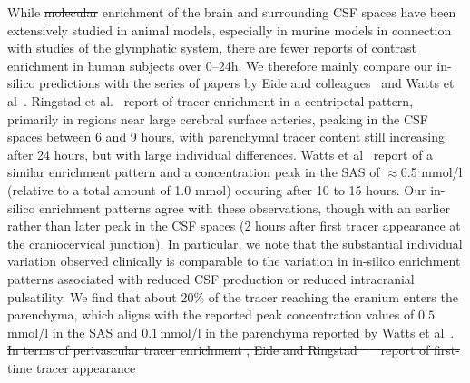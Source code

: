 \documentclass[fleqn,10pt]{wlscirep}
\providecommand{\DIFadd}[1]{{\protect\color{blue}\uwave{#1}}} %
\providecommand{\DIFdel}[1]{{\protect\color{red}\sout{#1}}}                      %
\providecommand{\DIFaddbegin}{} %
\providecommand{\DIFaddend}{} %
\providecommand{\DIFdelbegin}{} %
\providecommand{\DIFdelend}{} %
\begin{document}
While \DIFdelbegin \DIFdel{molecular }\DIFdelend \DIFaddbegin \DIFadd{tracer }\DIFaddend enrichment of the brain and surrounding CSF spaces
have been extensively studied in animal models, especially in murine
models in connection with studies of the glymphatic system, there are
fewer reports of contrast enrichment in human subjects over 0--24h. We
therefore mainly compare our in-silico predictions with the series of
papers by Eide and colleagues~\cite{ringstad2017glymphatic,
  ringstad2018brain, eide2021sleep, eide2024functional} and Watts et
al~\cite{watts2019measuring}. Ringstad et al.~\cite{ringstad2018brain}
report of tracer enrichment in a centripetal pattern, primarily in
regions near large cerebral surface arteries, peaking in the CSF
spaces between 6 and 9 hours, with parenchymal tracer content still
increasing after 24 hours, but with large individual
differences. Watts et al~\cite{watts2019measuring} report of a similar
enrichment pattern and a concentration peak in the SAS of $\approx$0.5
mmol/l (relative to a total amount of 1.0 mmol) occuring after 10 to 15 hours. 
Our in-silico enrichment patterns agree with these observations, though with an earlier rather than later peak in the CSF spaces (2 hours after first tracer appearance at the craniocervical junction). In particular, we note that the substantial individual variation observed clinically is comparable to the variation in in-silico enrichment patterns associated with reduced CSF production or reduced intracranial pulsatility. We find that about 20\% of the tracer reaching the cranium enters the parenchyma, which aligns with the reported peak concentration values of $0.5\,$mmol/l in the SAS and $0.1\,$mmol/l in the parenchyma reported by Watts et al~\cite{watts2019measuring}.
\DIFdelbegin \DIFdel{In terms of perivascular tracer
enrichment , Eide and Ringstad~\mbox{%
\cite{eide2024functional} }\hspace{0pt}%
report of first-time tracer appearance }\DIFdelend \DIFaddbegin 
\end{document}
